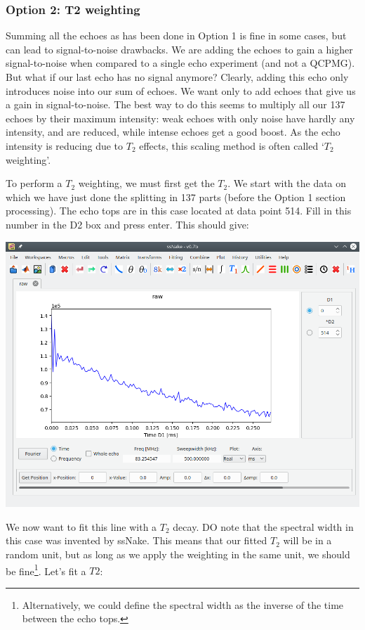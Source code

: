 \documentclass[11pt,a4paper]{article}
\begin{document}
\subsubsection{Option 2: T2 weighting}
Summing all the echoes as has been done in Option 1 is fine in some cases, but can lead to signal-to-noise
drawbacks. We are adding the echoes to gain a higher signal-to-noise when compared to a single echo
experiment (and not a QCPMG). But what if our last echo has no signal anymore? Clearly, adding this
echo only introduces noise into our sum of echoes. We want only to add echoes that give us a gain in
signal-to-noise. The best way to do this seems to multiply all our 137 echoes by their maximum
intensity: weak echoes with only noise have hardly any intensity, and are reduced, while intense
echoes get a good boost. As the echo intensity is reducing due to $T_2$ effects, this scaling method
is often called `$T_2$ weighting'.

To perform a $T_2$  weighting, we must first get the $T_2$. We start with the data on which we have
just done the splitting in 137 parts (before the Option 1 section processing). The echo tops are in
this case located at data point 514. Fill in this number in the D2 box and press enter. This should
give:
\begin{center}
\includegraphics[width=0.7\linewidth]{Figs/Fig7.png}
\end{center}

We now want to fit this line with a $T_2$ decay. DO note that the spectral width in this case was
invented by ssNake. This means that our fitted $T_2$ will be in a random unit, but as long as we
apply the weighting in the same unit, we should be fine\footnote{Alternatively, we could define the
spectral width as the inverse of the time between the echo tops.}. Let's fit a $T2$:
\end{document}
